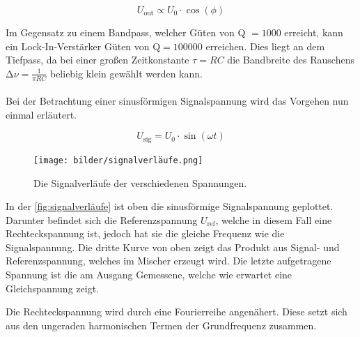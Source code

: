     \begin{equation*}
        U_{\text{out}} \propto U_0 \cdot \cos(\phi)
    \end{equation*}

    \noindent Im Gegensatz zu einem Bandpass, welcher Güten von Q $= \num{1000}$ erreicht, kann ein Lock-In-Verstärker Güten von Q$= \num{100000}$ erreichen. Dies liegt an dem 
    Tiefpass, da bei einer großen Zeitkonstante $ \tau = RC$ die Bandbreite des Rauschens $\increment \nu = \frac{1}{\pi RC}$ beliebig klein gewählt werden kann.
    \\
    \\

    \noindent Bei der Betrachtung einer sinusförmigen Signalspannung wird das Vorgehen nun einmal erläutert. 

    \begin{equation*}
        U_{\text{sig}} = U_0 \cdot \sin(\omega t)
    \end{equation*}

    \begin{figure}
        \centering
        \texttt{[image: bilder/signalverläufe.png]}
        \caption{Die Signalverläufe der verschiedenen Spannungen.}
        \label{fig:signalverläufe}
    \end{figure}

    \noindent In der \autoref{fig:signalverläufe} ist oben die sinusförmige Signalspannung geplottet. Darunter befindet sich die Referenzspannung $U_{\text{ref}}$, welche in diesem 
    Fall eine Rechteckspannung ist, jedoch hat sie die gleiche Frequenz wie die Signalspannung. Die dritte Kurve von oben zeigt das Produkt aus Signal- und Referenzspannung, welches
    im Mischer erzeugt wird. Die letzte aufgetragene Spannung ist die am Ausgang Gemessene, welche wie erwartet eine Gleichspannung zeigt. 

    \noindent Die Rechteckspannung wird durch eine Fourierreihe angenähert. Diese setzt sich aus den ungeraden harmonischen Termen der Grundfrequenz zusammen.


